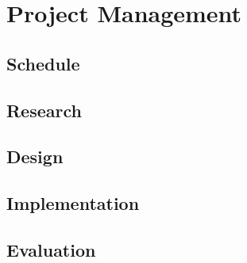 
\chapter{Project Management} %

\label{Chapter3} %



\section{Schedule}


\section{Research}


\section{Design}


\section{Implementation}


\section{Evaluation}


